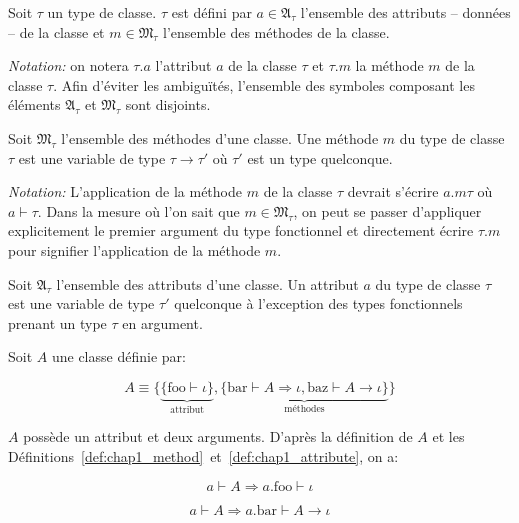 \begin{mydef}\label{def:chap1_class}
  Soit $\tau$ un type de classe. $\tau$ est défini par $a \in \mathfrak{A}_\tau$
  l'ensemble des attributs -- données -- de la classe et $m \in
  \mathfrak{M}_\tau$ l'ensemble des méthodes de la classe.

  \emph{Notation:} on notera $\tau.a$ l'attribut $a$ de la classe $\tau$ et
  $\tau.m$ la méthode $m$ de la classe $\tau$. Afin d'éviter les ambiguïtés,
  l'ensemble des symboles composant les éléments $\mathfrak{A}_\tau$ et
  $\mathfrak{M}_\tau$ sont disjoints.
\end{mydef}

\begin{mydef}\label{def:chap1_method}
  Soit $\mathfrak{M}_\tau$ l'ensemble des méthodes d'une classe. Une
  méthode $m$ du type de classe $\tau$ est une variable de type $\tau
  \rightarrow \tau'$ où $\tau'$ est un type quelconque.

  \emph{Notation:} L'application de la méthode $m$ de la classe $\tau$
  devrait s'écrire $a.m \tau$ où $a \vdash \tau$. Dans la mesure où
  l'on sait que $m \in \mathfrak{M}_\tau$, on peut se passer
  d'appliquer explicitement le premier argument du type fonctionnel et
  directement écrire $\tau.m$ pour signifier l'application de la
  méthode $m$.
\end{mydef}

\begin{mydef}\label{def:chap1_attribute}
  Soit $\mathfrak{A}_\tau$ l'ensemble des attributs d'une classe. Un
  attribut $a$ du type de classe $\tau$ est une variable de type
  $\tau'$ quelconque à l'exception des types fonctionnels prenant un
  type $\tau$ en argument.
\end{mydef}


\begin{myexample}\label{ex:chap1_class}
  Soit $A$ une classe définie par:

  \begin{equation}
    A \equiv \{ \underbrace{\{ \text{foo} \vdash \iota
      \}}_{\text{attribut}}, \underbrace{\{ \text{bar} \vdash A
      \Rightarrow \iota, \text{baz} \vdash A \rightarrow \iota
      \}}_{\text{méthodes}} \}
  \end{equation}

  $A$ possède un attribut et deux arguments. D'après la définition de
  $A$ et les
  Définitions~\ref{def:chap1_method}~et~\ref{def:chap1_attribute}, on
  a:

  \begin{equation}
    a \vdash A \Rightarrow a.\text{foo} \vdash \iota
  \end{equation}

  \begin{equation}
    a \vdash A \Rightarrow a.\text{bar} \vdash A \rightarrow \iota
  \end{equation}
\end{myexample}


